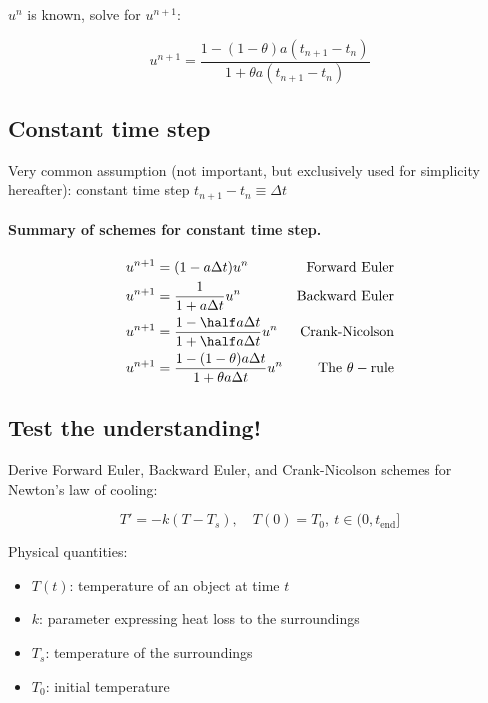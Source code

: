 \documentclass[%
oneside,                 %
final,                   %
10pt]{article}
\begin{document}
\noindent
$u^n$ is known, solve for $u^{n+1}$:

\begin{equation}
u^{n+1} = \frac{1 - (1-\theta) a(t_{n+1}-t_n)}{1 + \theta a(t_{n+1}-t_n)}
\label{decay:th}
\end{equation}


\subsection*{Constant time step}

Very common assumption (not important, but exclusively used for
simplicity hereafter): constant time step $t_{n+1}-t_n\equiv\Delta t$



\paragraph{Summary of schemes for constant time step.}
\begin{alignat}{2}
u^{n+1} &= (1 - a\Delta t )u^n  & \hbox{Forward Euler}
\label{decay:FE:u}\\ 
u^{n+1} &= \frac{1}{1+ a\Delta t} u^n  & \hbox{Backward Euler}
\label{decay:BE:u}\\ 
u^{n+1} &= \frac{1-\half a\Delta t}{1 + \half a\Delta t} u^n & \hbox{Crank-Nicolson}
\label{decay:CN:u}\\ 
u^{n+1} &= \frac{1 - (1-\theta) a\Delta t}{1 + \theta a \Delta t}u^n  & \hbox{The }\theta-\hbox{rule}
\label{decay:th:u}
\end{alignat}



\subsection*{Test the understanding!}

Derive Forward Euler, Backward Euler, and Crank-Nicolson schemes for
Newton's law of cooling:

\[ T' = -k(T-T_s),\quad T(0)=T_0,\ t\in (0,t_{\mbox{end}}]\]

Physical quantities:

\begin{itemize}
 \item $T(t)$: temperature of an object at time $t$

 \item $k$: parameter expressing heat loss to the surroundings

 \item $T_s$: temperature of the surroundings

 \item $T_0$: initial temperature
\end{itemize}
\end{document}
